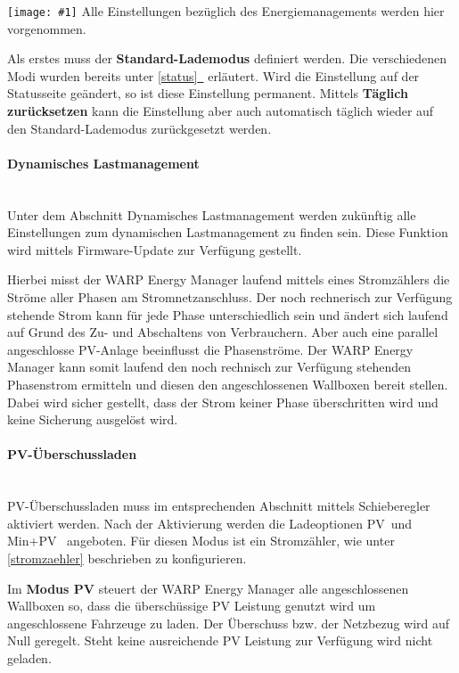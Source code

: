 \documentclass[a4paper,10pt]{article}
\newcommand{\gfx}[1]{\texttt{[image: \#1]}}
\newcommand*{\fullref}[1]{\hyperref[{#1}]{\ref*{#1}~\nameref*{#1}}}
\begin{document}
\begin{multicols*}{2}
	\gfx{./img/resized/web_em_settings}
	Alle Einstellungen bezüglich des Energiemanagements werden hier vorgenommen.

	Als erstes muss der \textbf{Standard-Lademodus} definiert werden. Die
	verschiedenen Modi wurden bereits unter \fullref{status} erläutert. 
	Wird die Einstellung auf der Statusseite geändert, so ist diese Einstellung permanent.
	Mittels \textbf{Täglich zurücksetzen} kann die Einstellung aber auch 
	automatisch täglich wieder auf den Standard-Lademodus zurückgesetzt werden.

	\paragraph{Dynamisches Lastmanagement}\ \\
	Unter dem Abschnitt Dynamisches Lastmanagement werden zukünftig
	alle Einstellungen zum dynamischen Lastmanagement zu finden sein. Diese
	Funktion wird mittels Firmware-Update zur Verfügung gestellt.

	Hierbei misst der WARP Energy Manager laufend mittels eines Stromzählers die
	Ströme aller Phasen am Stromnetzanschluss. Der noch rechnerisch zur
	Verfügung stehende Strom kann für jede Phase unterschiedlich sein und ändert
	sich laufend auf Grund des Zu- und Abschaltens von Verbrauchern. Aber auch eine
	parallel angeschlosse PV-Anlage beeinflusst die Phasenströme. Der WARP
	Energy Manager kann somit laufend den noch rechnisch zur Verfügung stehenden
	Phasenstrom ermitteln und diesen den angeschlossenen Wallboxen bereit
	stellen. Dabei wird sicher gestellt, dass der Strom keiner Phase
	überschritten wird und keine Sicherung ausgelöst wird.

	\paragraph{PV-Überschussladen}\ \\
	PV-Überschussladen muss im entsprechenden Abschnitt mittels
	Schieberegler aktiviert werden. Nach der Aktivierung werden die Ladeoptionen
	\glqq PV\grqq~und \glqq Min+PV\grqq~ angeboten. Für diesen Modus ist ein
	Stromzähler, wie unter \ref{stromzaehler} beschrieben zu konfigurieren.

	Im \textbf{Modus \glqq PV\grqq}
	steuert der WARP Energy Manager alle angeschlossenen Wallboxen so, dass die
	überschüssige PV Leistung genutzt wird um angeschlossene Fahrzeuge zu laden.
	Der Überschuss bzw. der Netzbezug wird auf Null geregelt. Steht keine
	ausreichende PV Leistung zur Verfügung wird nicht geladen.


\end{multicols*}
\end{document}

